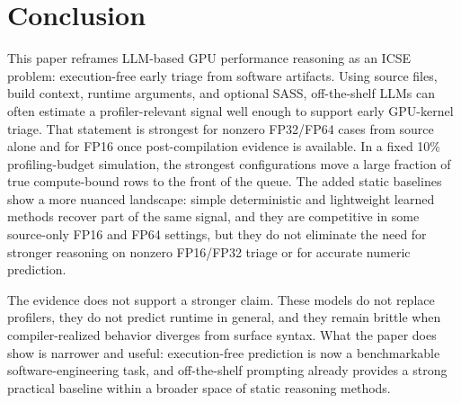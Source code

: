\section{Conclusion}
\label{sec:conclusion}

This paper reframes LLM-based GPU performance reasoning as an ICSE problem: execution-free early triage from software artifacts.
Using source files, build context, runtime arguments, and optional SASS, off-the-shelf LLMs can often estimate a profiler-relevant \rai signal well enough to support early GPU-kernel triage.
That statement is strongest for nonzero FP32/FP64 cases from source alone and for FP16 once post-compilation evidence is available.
In a fixed 10\% profiling-budget simulation, the strongest configurations move a large fraction of true compute-bound rows to the front of the queue.
The added static baselines show a more nuanced landscape:
simple deterministic and lightweight learned methods recover part of the same signal, and they are competitive in some source-only FP16 and \sourcesass FP64 settings, but they do not eliminate the need for stronger reasoning on nonzero FP16/\sourcesass FP32 triage or for accurate numeric \rai prediction.

The evidence does not support a stronger claim.
These models do not replace profilers, they do not predict runtime in general, and they remain brittle when compiler-realized behavior diverges from surface syntax.
What the paper does show is narrower and useful: execution-free \rai prediction is now a benchmarkable software-engineering task, and off-the-shelf prompting already provides a strong practical baseline within a broader space of static reasoning methods.
